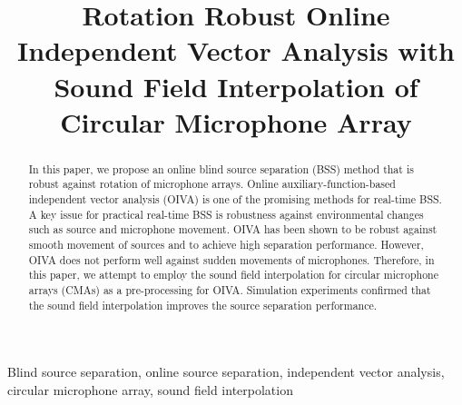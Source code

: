 \documentclass{article}
\title{Rotation Robust Online Independent Vector Analysis with\\Sound Field Interpolation of Circular Microphone Array}
\begin{document}
\maketitle

\begin{abstract}
  In this paper, we propose an online blind source separation (BSS) method that is robust against rotation of microphone arrays.
  Online auxiliary-function-based independent vector analysis (OIVA) is one of the promising methods for real-time BSS.
  A key issue for practical real-time BSS is robustness against environmental changes such as source and microphone movement.
  OIVA has been shown to be robust against smooth movement of sources and to achieve high separation performance.
  However, OIVA does not perform well against sudden movements of microphones.
  Therefore, in this paper, we attempt to employ the sound field interpolation for circular microphone arrays (CMAs) as a pre-processing for OIVA.
  Simulation experiments confirmed that the sound field interpolation improves the source separation performance.
\end{abstract}
\begin{keywords}
  Blind source separation,
  online source separation,
  independent vector analysis,
  circular microphone array,
  sound field interpolation
\end{keywords}
\end{document}
